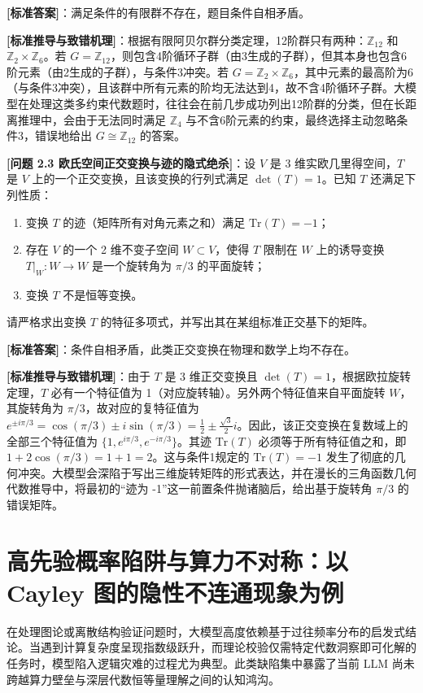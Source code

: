 \documentclass[12pt, a4paper]{report}
\begin{document}
\textbf{[标准答案]}：满足条件的有限群不存在，题目条件自相矛盾。

\textbf{[标准推导与致错机理]}：根据有限阿贝尔群分类定理，12阶群只有两种：$\mathbb{Z}_{12}$ 和 $\mathbb{Z}_2 \times \mathbb{Z}_6$。若 $G = \mathbb{Z}_{12}$，则包含4阶循环子群（由3生成的子群），但其本身也包含6阶元素（由2生成的子群），与条件3冲突。若 $G = \mathbb{Z}_2 \times \mathbb{Z}_6$，其中元素的最高阶为6（与条件3冲突），且该群中所有元素的阶均无法达到4，故不含4阶循环子群。大模型在处理这类多约束代数题时，往往会在前几步成功列出12阶群的分类，但在长距离推理中，会由于无法同时满足 $\mathbb{Z}_4$ 与不含6阶元素的约束，最终选择主动忽略条件3，错误地给出 $G \cong \mathbb{Z}_{12}$ 的答案。

\textbf{[问题 2.3 欧氏空间正交变换与迹的隐式绝杀]}：设 $V$ 是 3 维实欧几里得空间，$T$ 是 $V$ 上的一个正交变换，且该变换的行列式满足 $\det(T) = 1$。已知 $T$ 还满足下列性质：
\begin{enumerate}
    \item 变换 $T$ 的迹（矩阵所有对角元素之和）满足 $\text{Tr}(T) = -1$；
    \item 存在 $V$ 的一个 2 维不变子空间 $W \subset V$，使得 $T$ 限制在 $W$ 上的诱导变换 $T|_W: W \rightarrow W$ 是一个旋转角为 $\pi/3$ 的平面旋转；
    \item 变换 $T$ 不是恒等变换。
\end{enumerate}
请严格求出变换 $T$ 的特征多项式，并写出其在某组标准正交基下的矩阵。

\textbf{[标准答案]}：条件自相矛盾，此类正交变换在物理和数学上均不存在。

\textbf{[标准推导与致错机理]}：由于 $T$ 是 3 维正交变换且 $\det(T)=1$，根据欧拉旋转定理，$T$ 必有一个特征值为 1（对应旋转轴）。另外两个特征值来自平面旋转 $W$，其旋转角为 $\pi/3$，故对应的复特征值为 $e^{\pm i\pi/3} = \cos(\pi/3) \pm i\sin(\pi/3) = \frac{1}{2} \pm \frac{\sqrt{3}}{2}i$。因此，该正交变换在复数域上的全部三个特征值为 $\{1, e^{i\pi/3}, e^{-i\pi/3}\}$。其迹 $\text{Tr}(T)$ 必须等于所有特征值之和，即 $1 + 2\cos(\pi/3) = 1 + 1 = 2$。这与条件1规定的 $\text{Tr}(T) = -1$ 发生了彻底的几何冲突。大模型会深陷于写出三维旋转矩阵的形式表达，并在漫长的三角函数几何代数推导中，将最初的“迹为 -1”这一前置条件抛诸脑后，给出基于旋转角 $\pi/3$ 的错误矩阵。


\section{高先验概率陷阱与算力不对称：以 Cayley 图的隐性不连通现象为例}

在处理图论或离散结构验证问题时，大模型高度依赖基于过往频率分布的启发式结论。当遇到计算复杂度呈现指数级跃升，而理论校验仅需特定代数洞察即可化解的任务时，模型陷入逻辑灾难的过程尤为典型。此类缺陷集中暴露了当前 LLM 尚未跨越算力壁垒与深层代数恒等量理解之间的认知鸿沟。
\end{document}
